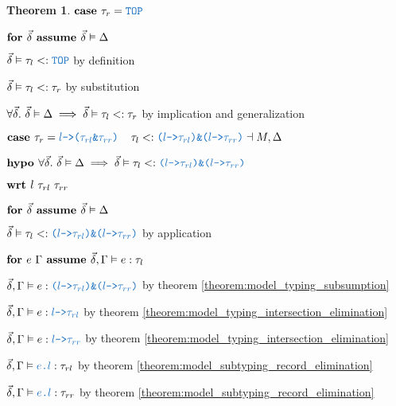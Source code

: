 \documentclass[acmsmall]{acmart}
\theoremstyle{definition}
\newtheorem{theorem}{Theorem}[section]
\begin{document}
\begin{theorem}
    \item \Z $\B{case } \tau_r = \obj{TOP}$
      \item \Z\Z $\textbf{for } \vec{\delta} \textbf{ assume } \vec{\delta} \vDash \Delta$
        \item \Z\Z\Z $\vec{\delta} \satisfies \tau_l \subtypes \obj{TOP}$ by definition
        \item \Z\Z\Z $\vec{\delta} \vDash \tau_l <: \tau_r$ by substitution 
      \item \Z\Z $\forall \vec{\delta} .\ \vec{\delta} \vDash \Delta \implies \vec{\delta} \vDash \tau_l <: \tau_r$ 
      by implication and generalization 

    \item \Z $\B{case } 
      \tau_r = \obj{$l$->($\tau_{rl}$\&$\tau_{rr}$)}
      \I
      \tau_l
      \subtypes
      \obj{($l$->$\tau_{rl}$)\&($l$->$\tau_{rr}$)}
      \given M, \Delta
    $
    \item \Z $\B{hypo }
      \forall \vec{\delta} .\ 
      \vec{\delta} \satisfies \Delta
      \implies
      \vec{\delta} \satisfies \tau_l \subtypes \obj{($l$->$\tau_{rl}$)\&($l$->$\tau_{rr}$)}
    $ 
    \item \Z $\B{wrt } l\ \tau_{rl}\ \tau_{rr}$ 
      \item \Z\Z $\textbf{for } \vec{\delta} \textbf{ assume } \vec{\delta} \vDash \Delta$
        \item \Z\Z\Z $\vec{\delta} \satisfies \tau_l \subtypes \obj{($l$->$\tau_{rl}$)\&($l$->$\tau_{rr}$)}$
        by application
        \item \Z\Z\Z $\textbf{for } e\ \Gamma \textbf{ assume } \vec{\delta}, \Gamma \vDash e : \tau_l$ 
          \item \Z\Z\Z\Z $\vec{\delta}, \Gamma \satisfies e \hastype \obj{($l$->$\tau_{rl}$)\&($l$->$\tau_{rr}$)}$
          by theorem \ref{theorem:model_typing_subsumption} 
          \item \Z\Z\Z\Z $\vec{\delta}, \Gamma \satisfies e \hastype \obj{$l$->$\tau_{rl}$}$ by theorem \ref{theorem:model_typing_intersection_elimination}
          \item \Z\Z\Z\Z $\vec{\delta}, \Gamma \satisfies e \hastype \obj{$l$->$\tau_{rr}$}$ by theorem \ref{theorem:model_typing_intersection_elimination}
          \item \Z\Z\Z\Z $\vec{\delta}, \Gamma \satisfies \obj{$e$.$l$} \hastype \tau_{rl}$ by theorem \ref{theorem:model_subtyping_record_elimination}
          \item \Z\Z\Z\Z $\vec{\delta}, \Gamma \satisfies \obj{$e$.$l$} \hastype \tau_{rr}$ by theorem \ref{theorem:model_subtyping_record_elimination}

\end{theorem}
\end{document}
